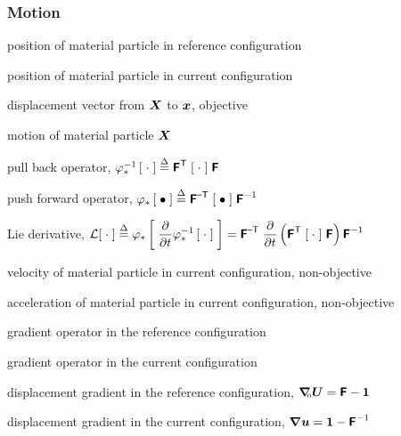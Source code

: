 \noindent\subsubsection*{Motion}
\begin{description}[noitemsep,align=right,labelwidth=1.5cm,labelsep=0.8cm]
\item [$\vX$] position of material particle in reference configuration
\item [$\vx$] position of material particle in current configuration
\item [$\vU$] displacement vector from $\vX$ to $\vx$, objective
\item [$\vvarphi$] motion of material particle $\vX$ 
\item 
\item [$\pullback{\cdot}$] pull back operator, $\varphi^{-1}_*\left[\;\cdot\;\right] \stackrel{\Delta}{=} \mbox{\sffamily\bfseries F}^{\mbox{\scriptsize \sffamily T}} \;[\;\cdot\;]\; \mbox{\sffamily\bfseries F}$
\item [$\pushforward{\bullet}$] push forward operator, $\varphi_*\left[\;\bullet\;\right] \stackrel{\Delta}{=} \mbox{\sffamily\bfseries F}^{\mbox{\scriptsize \sffamily --T}} \;[\;\bullet\;]\; \mbox{\sffamily\bfseries F}^{-1}$
\item
\item [$\lie{\cdot}$] Lie derivative, 
    $\mathcal L[\;\cdot\;] \stackrel{\Delta}{=} \varphi_*\left[\;\displaystyle\frac{\partial}{\partial t} \varphi^{-1}_*\left[\;\cdot\;\right]\;\right] = \mbox{\sffamily\bfseries F}^{\mbox{\scriptsize \sffamily --T}} \; \displaystyle\frac{\partial}{\partial t} 
\left( 
\mbox{\sffamily\bfseries F}^{\mbox{\scriptsize \sffamily T}} \;[\; \cdot \;]\; \mbox{\sffamily\bfseries F}
\right) \mbox{\sffamily\bfseries F}^{-1}$
\item 
\item [$\vv$] velocity of material particle in current 
configuration, non-objective
\item [$\va$] acceleration of material particle in current 
configuration, non-objective
\item 
\item [$\Grad (\;\bullet\;)$] gradient operator in the reference configuration
\item [$\grad (\;\cdot\;)$] gradient operator in the current configuration
\item 
\item [$\Grad \vU$] displacement gradient in the 
reference configuration, 
$\mbox{\boldmath $\nabla$}_{\hspace{-1mm}\mbox{\tiny 0}} \mbox{\boldmath $U$} = \mbox{\sffamily\bfseries F} - \mbox{\boldmath $1$}$
\item [$\grad \vu$] displacement gradient in the 
current configuration, 
$\mbox{\boldmath $\nabla$} \mbox{\boldmath $u$} = \mbox{\boldmath $1$} - \mbox{\sffamily\bfseries F}^{-1}$
\item 

\end{description}
